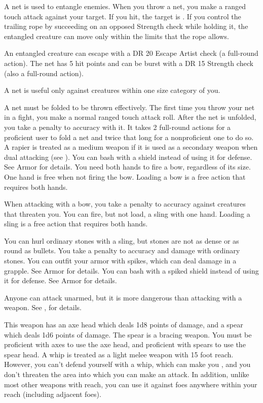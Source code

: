  A net is used to entangle enemies. When you throw a net, you make a ranged touch attack against your target. If you hit, the target is \entangled. If you control the trailing rope by succeeding on an opposed Strength check while holding it, the entangled creature can move only within the limits that the rope allows.
\par An entangled creature can escape with a DR 20 Escape Artist check (a full-round action). The net has 5 hit points and can be burst with a DR 15 Strength check (also a full-round action).
\par A net is useful only against creatures within one size category of you.
\par A net must be folded to be thrown effectively. The first time you throw your net in a fight, you make a normal ranged touch attack roll. After the net is unfolded, you take a  penalty to accuracy with it. It takes 2 full-round actions for a proficient user to fold a net and twice that long for a nonproficient one to do so.
 A rapier is treated as a medium weapon if it is used as a secondary weapon when dual attacking (see ).
 You can bash with a shield instead of using it for defense. See Armor for details.
 You need both hands to fire a bow, regardless of its size. One hand is free when not firing the bow. Loading a bow is a free action that requires both hands.
\par When attacking with a bow, you take a  penalty to accuracy against creatures that threaten you.
 You can fire, but not load, a sling with one hand. Loading a sling is a free action that requires both hands.
\par You can hurl ordinary stones with a sling, but stones are not as dense or as round as bullets. You take a  penalty to accuracy and damage with ordinary stones.
 You can outfit your armor with spikes, which can deal damage in a grapple. See Armor for details.
 You can bash with a spiked shield instead of using it for defense. See Armor for details.

 Anyone can attack unarmed, but it is more dangerous than attacking with a weapon. See , for details.

 This weapon has an axe head which deals 1d8 points of damage, and a spear which deals 1d6 points of damage. The spear is a bracing weapon. You must be proficient with axes to use the axe head, and proficient with spears to use the spear head.
 A whip is treated as a light melee weapon with 15 foot reach. However, you can't defend yourself with a whip, which can make you , and you don't threaten the area into which you can make an attack. In addition, unlike most other weapons with reach, you can use it against foes anywhere within your reach (including adjacent foes).

